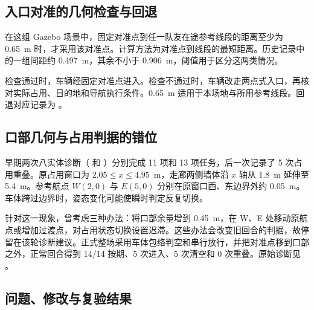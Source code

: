 \subsection{入口对准的几何检查与回退}\label{sec:C.2}

在这组 Gazebo 场景中，固定对准点到任一队友在途参考线段的距离至少为 0.65~m 时，才采用该对准点。计算方法为对准点到线段的最短距离。历史记录中的一组间距约 0.497~m，其余不小于 0.906~m，阈值用于区分这两类情况。

检查通过时，车辆经固定对准点进入。检查不通过时，车辆改走两点式入口，再核对实际占用、目的地和导航执行条件。0.65~m 适用于本场地与所用参考线段。回退对应记录为 。

\subsection{口部几何与占用判据的错位}\label{sec:C.3}

早期两次八实体诊断（ 和 ）分别完成 11 项和 13 项任务，后一次记录了 5 次占用重叠。原占用窗口为 $2.05\leq x\leq 4.95$~m，走廊两侧墙体沿 $x$ 轴从 1.8~m 延伸至 5.4~m。参考航点 $W(2,0)$ 与 $E(5,0)$ 分别在原窗口西、东边界外约 0.05~m。车体跨过边界时，姿态变化可能使瞬时判定反复切换。

针对这一现象，曾考虑三种办法：将口部余量增到 0.45~m，在 W、E 处移动原航点或增加过渡点，对占用状态切换设置迟滞。这些办法会改变旧回合的判据，故停留在该轮诊断建议。正式整场采用车体包络判空和串行放行，并把对准点移到口部之外，正常回合得到 14/14 按期、5 次进入、5 次清空和 0 次重叠。原始诊断见 。

\subsection{问题、修改与复验结果}\label{sec:C.4}

